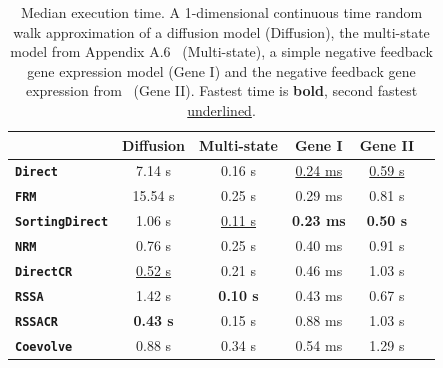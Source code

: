 \documentclass{juliacon}
\numberwithin{equation}{section}
\begin{document}
\begin{table}
\centering
\begin{tabular}{lccccc}
\toprule
 & \multicolumn{1}{c}{\textbf{ Diffusion }} & \multicolumn{1}{c}{\textbf{ Multi-state }} & \multicolumn{1}{c}{\textbf{ Gene I }} & \multicolumn{1}{c}{\textbf{ Gene II }} \\
\hline
\textbf{\texttt{Direct}}         & 7.14 s             & 0.16 s             & \underline{0.24 ms} & \underline{0.59 s} \\
\textbf{\texttt{FRM}}            & 15.54 s            & 0.25 s             & 0.29 ms             & 0.81 s             \\
\textbf{\texttt{SortingDirect}}  & 1.06 s             & \underline{0.11 s} & \textbf{0.23 ms}    & \textbf{0.50 s}    \\
\textbf{\texttt{NRM}}            & 0.76 s             & 0.25 s             & 0.40 ms             & 0.91 s             \\
\textbf{\texttt{DirectCR}}       & \underline{0.52 s} & 0.21 s             & 0.46 ms             & 1.03 s             \\
\textbf{\texttt{RSSA}}           & 1.42 s             & \textbf{0.10 s}    & 0.43 ms             & 0.67 s             \\
\textbf{\texttt{RSSACR}}         & \textbf{0.43 s}    & 0.15 s             & 0.88 ms             & 1.03 s             \\
\textbf{\texttt{Coevolve}}       & 0.88 s             & 0.34 s             & 0.54 ms             & 1.29 s             \\
\bottomrule
\end{tabular}
\caption{Median execution time. A 1-dimensional continuous time random walk approximation of a diffusion model (Diffusion), the multi-state model from Appendix A.6~\cite{marchetti2017} (Multi-state), a simple negative feedback gene expression model (Gene I) and the negative feedback gene expression from~\cite{gupta2018} (Gene II). Fastest time is \textbf{bold}, second fastest \underline{underlined}.}
\label{tab:benchmark-biochemistry}
\end{table}
\end{document}
